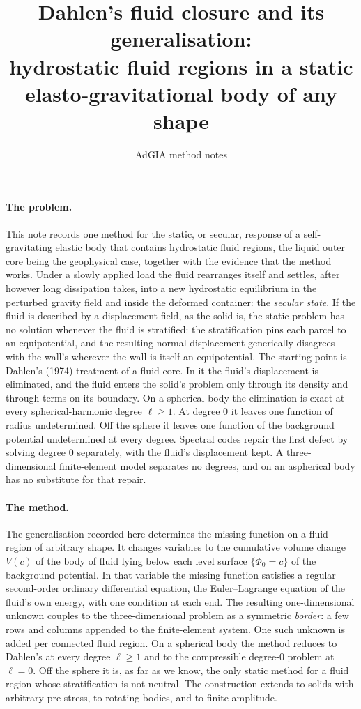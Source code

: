 \documentclass[11pt]{article}
\title{Dahlen's fluid closure and its generalisation:\\
       hydrostatic fluid regions in a static\\
       elasto-gravitational body of any shape}
\author{AdGIA method notes}
\date{}
\theoremstyle{definition}
\theoremstyle{remark}
\begin{document}
\maketitle
\sloppy

\paragraph{The problem.} This note records one method for the static,
or secular, response of a self-gravitating elastic body that contains
hydrostatic fluid regions, the liquid outer core being the
geophysical case, together with the evidence that the method works.
Under a slowly applied load the fluid rearranges itself and settles,
after however long dissipation takes, into a new hydrostatic
equilibrium in the perturbed gravity field and inside the deformed
container: the \emph{secular state}. If the fluid is described by a
displacement field, as the solid is, the static problem has no
solution whenever the fluid is stratified: the stratification pins
each parcel to an equipotential, and the resulting normal
displacement generically disagrees with the wall's wherever the wall
is itself an equipotential. The starting point is Dahlen's (1974)
treatment of a fluid core. In it the fluid's displacement is
eliminated, and the fluid enters the solid's problem only through its
density and through terms on its boundary. On a spherical body the
elimination is exact at every spherical-harmonic degree $\ell \ge 1$.
At degree $0$ it leaves one function of radius undetermined. Off the
sphere it leaves one function of the background potential
undetermined at every degree. Spectral codes repair the first defect
by solving degree $0$ separately, with the fluid's displacement kept.
A three-dimensional finite-element model separates no degrees, and on
an aspherical body has no substitute for that repair.

\paragraph{The method.} The generalisation recorded here determines
the missing function on a fluid region of arbitrary shape. It changes
variables to the cumulative volume change $V(c)$ of the body of fluid
lying below each level surface $\{\Phi_0 = c\}$ of the background
potential. In that variable the missing function satisfies a regular
second-order ordinary differential equation, the Euler--Lagrange
equation of the fluid's own energy, with one condition at each end.
The resulting one-dimensional unknown couples to the
three-dimensional problem as a symmetric \emph{border}: a few rows
and columns appended to the finite-element system. One such unknown
is added per connected fluid region. On a spherical body the method
reduces to Dahlen's at every degree $\ell \ge 1$ and to the
compressible degree-0 problem at $\ell = 0$. Off the sphere it is, as
far as we know, the only static method for a fluid region whose
stratification is not neutral. The construction extends to solids
with arbitrary pre-stress, to rotating bodies, and to finite
amplitude.
\end{document}
